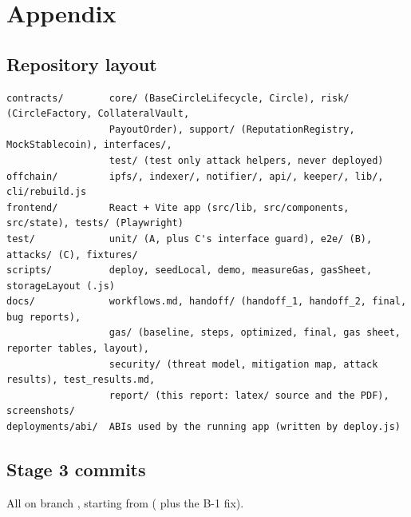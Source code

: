 \section{Appendix}
\label{sec:appendix}

\subsection{Repository layout}
\begin{lstlisting}[language={}]
contracts/        core/ (BaseCircleLifecycle, Circle), risk/ (CircleFactory, CollateralVault,
                  PayoutOrder), support/ (ReputationRegistry, MockStablecoin), interfaces/,
                  test/ (test only attack helpers, never deployed)
offchain/         ipfs/, indexer/, notifier/, api/, keeper/, lib/, cli/rebuild.js
frontend/         React + Vite app (src/lib, src/components, src/state), tests/ (Playwright)
test/             unit/ (A, plus C's interface guard), e2e/ (B), attacks/ (C), fixtures/
scripts/          deploy, seedLocal, demo, measureGas, gasSheet, storageLayout (.js)
docs/             workflows.md, handoff/ (handoff_1, handoff_2, final, bug reports),
                  gas/ (baseline, steps, optimized, final, gas sheet, reporter tables, layout),
                  security/ (threat model, mitigation map, attack results), test_results.md,
                  report/ (this report: latex/ source and the PDF), screenshots/
deployments/abi/  ABIs used by the running app (written by deploy.js)
\end{lstlisting}

\subsection{Stage 3 commits}
\label{app:commits}
All on branch , starting from  ( plus the B-1 fix).

